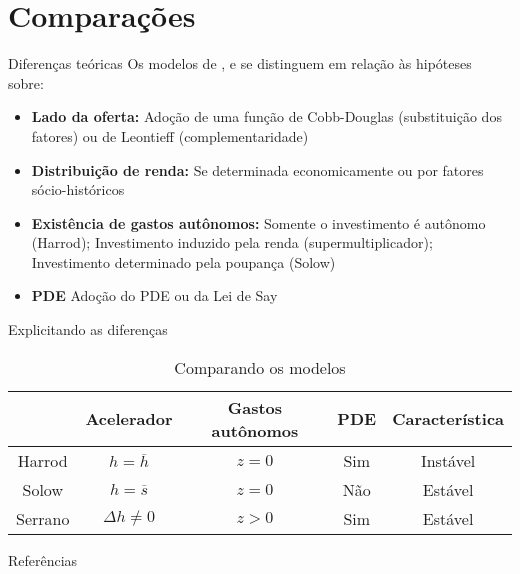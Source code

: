 \documentclass[10pt]{beamer}
\begin{document}
\section{Comparações}

\begin{frame}{Diferenças teóricas}
	Os modelos de \textcite{harrod_essay_1939}, \textcite{solow_contribution_1956} e \textcite{serrano_long_1995} se distinguem em relação às hipóteses sobre:
	
	\begin{itemize}
		\item \textbf{Lado da oferta:} Adoção de uma função de Cobb-Douglas (substituição dos fatores) ou de Leontieff (complementaridade)
		\item \textbf{Distribuição de renda:} Se determinada economicamente ou por fatores sócio-históricos
		\item \textbf{Existência de gastos autônomos:} Somente o investimento é autônomo (Harrod); Investimento induzido pela renda (supermultiplicador); Investimento determinado pela poupança (Solow)
		\item \textbf{PDE} Adoção do PDE ou da Lei de Say
	\end{itemize}
\end{frame}

\begin{frame}{Explicitando as diferenças}

\begin{table}
	\caption{Comparando os modelos}
	\centering
\begin{tabular}{c|c|c|c|c}
	\hline \hline
	& Acelerador & Gastos autônomos & PDE & Característica\\ 
	\hline 
	Harrod & $h = \overline{h}$ & $z=0$ & Sim & Instável\\ 
	\hline 
	Solow & $h = \overline{s}$ & $z=0$ & Não & Estável\\ 
	\hline 
	Serrano & $\Delta h \neq 0$ & $z>0$ & Sim & Estável\\ 
	\hline \hline
\end{tabular} 
\end{table}
\end{frame}

\begin{frame}[allowframebreaks]{Referências}
\printbibliography
\end{frame}
\end{document}
